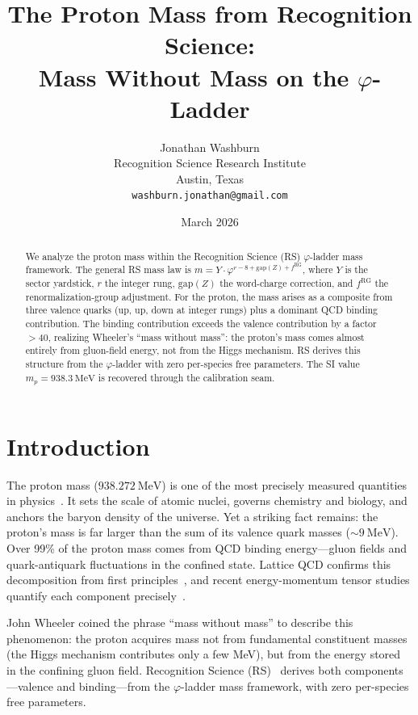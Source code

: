 \documentclass[12pt,a4paper]{article}
\title{The Proton Mass from Recognition Science:\\
Mass Without Mass on the $\varphi$-Ladder}
\author{Jonathan Washburn\\
Recognition Science Research Institute\\
Austin, Texas\\
\texttt{washburn.jonathan@gmail.com}}
\date{March 2026}
\theoremstyle{definition}
\theoremstyle{remark}
\begin{document}
\maketitle

\begin{abstract}
We analyze the proton mass within the Recognition Science (RS)
$\varphi$-ladder mass framework.  The general RS mass law is
$m = Y \cdot \varphi^{r - 8 + \mathrm{gap}(Z) + f^{\mathrm{RG}}}$,
where $Y$ is the sector yardstick, $r$ the integer rung,
$\mathrm{gap}(Z)$ the word-charge correction, and
$f^{\mathrm{RG}}$ the renormalization-group adjustment.  For
the proton, the mass arises as a composite from three valence
quarks (up, up, down at integer rungs) plus a dominant QCD
binding contribution.  The binding contribution exceeds the
valence contribution by a factor $> 40$, realizing Wheeler's
``mass without mass'': the proton's mass comes almost entirely
from gluon-field energy, not from the Higgs mechanism.
RS derives this structure from the $\varphi$-ladder with zero
per-species free parameters.  The SI value
$m_p = 938.3~\mathrm{MeV}$ is recovered through the
calibration seam.
\end{abstract}

\section{Introduction}
\label{sec:intro}

The proton mass ($938.272~\mathrm{MeV}$) is one of the most
precisely measured quantities in physics~\cite{PDG}.  It sets the
scale of atomic nuclei, governs chemistry and biology, and anchors
the baryon density of the universe.  Yet a striking fact remains:
the proton's mass is far larger than the sum of its valence quark
masses ($\sim 9~\mathrm{MeV}$).  Over 99\% of the proton mass
comes from QCD binding energy---gluon fields and quark-antiquark
fluctuations in the confined state.  Lattice QCD confirms this
decomposition from first principles~\cite{LatticeQCD},
and recent energy-momentum tensor studies quantify
each component precisely~\cite{Yang2018}.

John Wheeler coined the phrase ``mass without mass'' to describe
this phenomenon: the proton acquires mass not from fundamental
constituent masses (the Higgs mechanism contributes only a few
MeV), but from the energy stored in the confining gluon field.
Recognition Science (RS)~\cite{RS_Axioms} derives both
components---valence and binding---from the $\varphi$-ladder mass
framework, with zero per-species free parameters.
\end{document}
